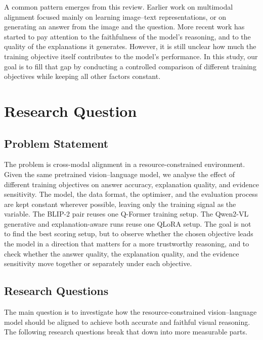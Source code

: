 \documentclass[12pt,bibliography=totoc,listof=totoc,BCOR=5mm,DIV=12,oneside,open=any]{scrbook}
\begin{document}
A common pattern emerges from this review.
Earlier work on multimodal alignment focused mainly on learning image--text representations, or on generating an answer from the image and the question.
More recent work has started to pay attention to the faithfulness of the model's reasoning, and to the quality of the explanations it generates.
However, it is still unclear how much the training objective itself contributes to the model's performance.
In this study, our goal is to fill that gap by conducting a controlled comparison of different training objectives while keeping all other factors constant.

\chapter{Research Question}
\section{Problem Statement}
The problem is cross-modal alignment in a resource-constrained environment.
Given the same pretrained vision--language model, we analyse the effect of different training objectives on answer accuracy, explanation quality, and evidence sensitivity.
The model, the data format, the optimiser, and the evaluation process are kept constant wherever possible, leaving only the training signal as the variable.
The BLIP-2 pair reuses one Q-Former training setup. The Qwen2-VL generative and explanation-aware runs reuse one QLoRA setup.
The goal is not to find the best scoring setup, but to observe whether the chosen objective leads the model in a direction that matters for a more trustworthy reasoning,
and to check whether the answer quality, the explanation quality, and the evidence sensitivity move together or separately under each objective.

\section{Research Questions}
The main question is to investigate how the resource-constrained vision--language model should be aligned to achieve both accurate and faithful visual reasoning.
The following research questions break that down into more measurable parts.
\end{document}
